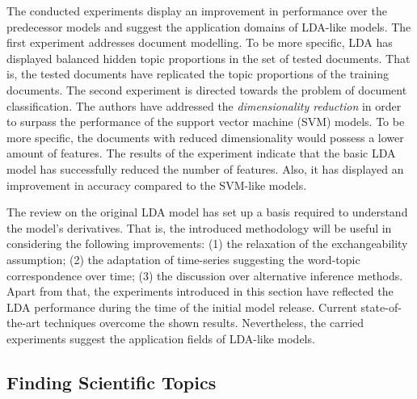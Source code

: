 \documentclass{mprop}
\begin{document}
\par The conducted experiments display an improvement in performance over the predecessor models and suggest the application domains of LDA-like models. The first experiment addresses document modelling. To be more specific, LDA has displayed balanced hidden topic proportions in the set of tested documents. That is, the tested documents have replicated the topic proportions of the training documents. The second experiment is directed towards the problem of document classification. The authors have addressed the \textit{dimensionality reduction} in order to surpass the performance of the support vector machine (SVM) models. To be more specific, the documents with reduced dimensionality would possess a lower amount of features. The results of the experiment indicate that the basic LDA model has successfully reduced the number of features. Also, it has displayed an improvement in accuracy compared to the SVM-like models. 

\par The review on the original LDA model has set up a basis required to understand the model's derivatives. That is, the introduced methodology will be useful in considering the following improvements: (1) the relaxation of the exchangeability assumption; (2) the adaptation of time-series suggesting the word-topic correspondence over time; (3) the discussion over alternative inference methods. Apart from that, the experiments introduced in this section have reflected the LDA performance during the time of the initial model release. Current state-of-the-art techniques overcome the shown results. Nevertheless, the carried experiments suggest the application fields of LDA-like models.

\subsection{Finding Scientific Topics}
\end{document}
